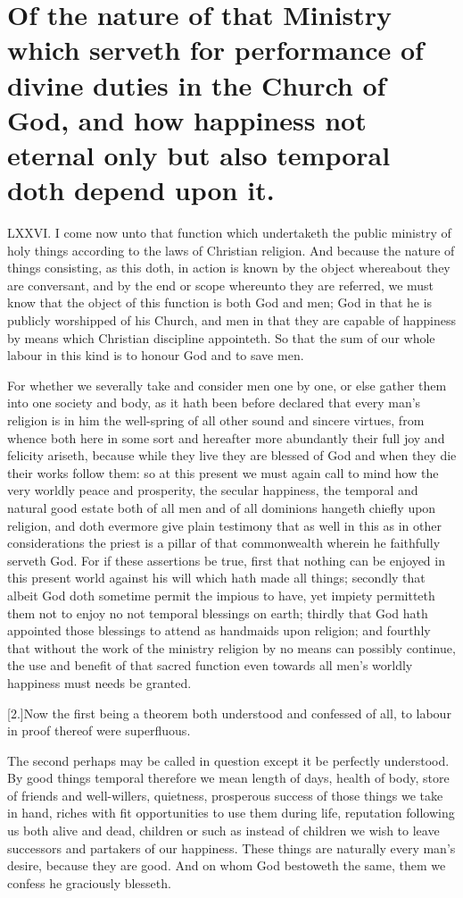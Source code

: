 \section*{Of the nature of that Ministry which serveth for performance of divine duties in the Church of God, and how happiness not eternal only but also temporal doth depend upon it.}
LXXVI. I come now unto that function which undertaketh the public ministry of holy things according to the laws of Christian religion. And because the nature of things consisting, as this doth, in action is known by the object whereabout they are conversant, and by the end or scope whereunto they are referred, we must know that the object of this function is both God and men; God in that he is publicly worshipped of his Church, and men in that they are capable of happiness by means which Christian discipline appointeth. So that the sum of our whole labour in this kind is to honour God and to save men.

For whether we severally take and consider men one by one, or else gather them into one society and body, as it hath been before declared that every man’s religion is in him the well-spring of all other sound and sincere virtues, from whence both here in some sort and hereafter more abundantly their full joy and felicity ariseth, because while they live they are blessed of God and when they die their works follow them: so at this present we must again call to mind how the very worldly peace and prosperity, the secular happiness, the temporal  and natural good estate both of all men and of all dominions hangeth chiefly upon religion,
 and doth evermore give plain testimony that as well in this as in other considerations the priest is a pillar of that commonwealth wherein he faithfully serveth God. For if these assertions be true, first that nothing can be enjoyed in this present world against his will which hath made all things; secondly that albeit God doth sometime permit the impious to have, yet impiety permitteth them not to enjoy no not temporal blessings on earth; thirdly that God hath appointed those blessings to attend as handmaids upon religion; and fourthly that without the work of the ministry religion by no means can possibly continue, the use and benefit of that sacred function even towards all men’s worldly happiness must needs be granted.

[2.]Now the first being a theorem both understood and confessed of all, to labour in proof thereof were superfluous.

The second perhaps may be called in question except it be perfectly understood. By good things temporal therefore we mean length of days, health of body, store of friends and well-willers, quietness, prosperous success of those things we take in hand, riches with fit opportunities to use them during life, reputation following us both alive and dead, children or such as instead of children we wish to leave successors and partakers of our happiness. These things are naturally every man’s desire, because they are good. And on whom God bestoweth the same, them we confess he graciously blesseth.

